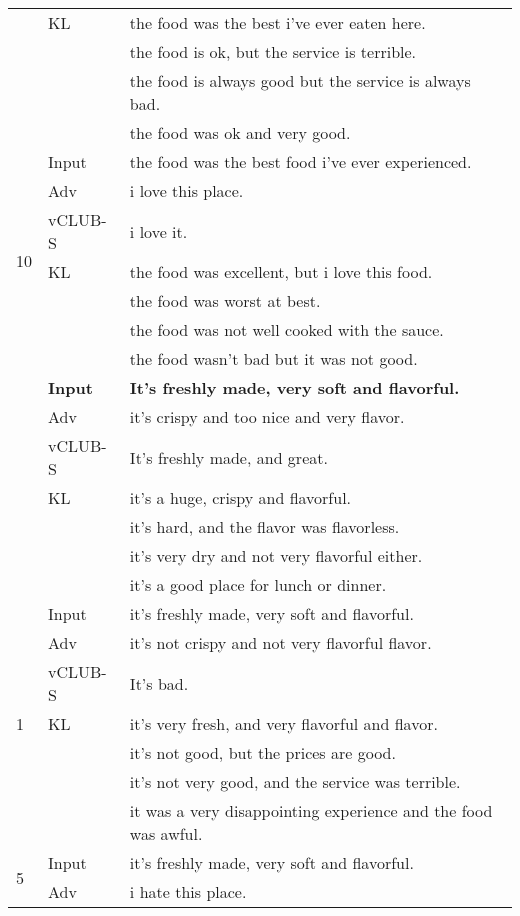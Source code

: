 \begin{table}
{\begin{tabular}{ll|l}
&KL  &   the food was the best i've ever eaten here.\\
&  &  the food is ok, but the service is terrible. \\
&  &  	the food is always good but the service is always bad. \\
&  &  the food was ok and very good. \\\hline
\multirow{7}{*}{10} &Input  & the food was the best food i've ever experienced.  \\\hline
&Adv  & i love this place.  \\
&vCLUB-S  & i love it. \\
&KL  &  the food was excellent, but i love this food. \\
&  & the food was worst at best.  \\
&  & the food was not well cooked with the sauce.  \\
&  & 	the food wasn't bad but it was not good.  \\\hline\hline
\fi \multirow{7}{*}{0.1} &\textbf{Input}  &  	\textbf{It's freshly made, very soft and flavorful.} \\\hline
&Adv  & it's crispy and too nice and very flavor.  \\
&vCLUB-S  & It's freshly made, and great. \\
&KL  & it's a huge, crispy and flavorful.  \\
&  &  it's hard, and the flavor was flavorless. \\
&  & it's very dry and not very flavorful either.  \\
&  & it's a good place for lunch or dinner.  \\ \hline
\multirow{7}{*}{1} &Input  & 	it's freshly made, very soft and flavorful.  \\\hline
&Adv  &  it's not crispy and not very flavorful flavor. \\
&vCLUB-S  & It's bad. \\
&KL  & 	it's very fresh, and very flavorful and flavor.  \\
&  & it's not good, but the prices are good.  \\
&  &  it's not very good, and the service was terrible. \\
& &	it was a very disappointing experience and the food was awful.   \\\hline
\multirow{7}{*}{5} &Input  & 	it's freshly made, very soft and flavorful.  \\\hline
&Adv  &  	i hate this place. \\

\end{tabular}}
\end{table}
